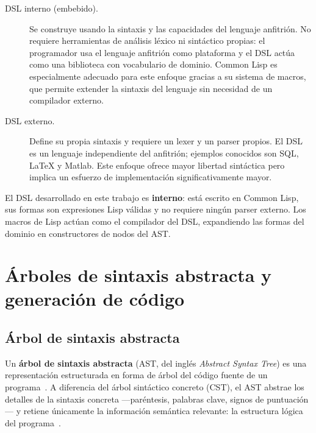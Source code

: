 \begin{description}
  \item[DSL interno (embebido).] Se construye usando la sintaxis y las
    capacidades del lenguaje anfitrión.  No requiere herramientas de análisis
    léxico ni sintáctico propias: el programador usa el lenguaje anfitrión
    como plataforma y el DSL actúa como una biblioteca con vocabulario de
    dominio.  Common Lisp es especialmente adecuado para este enfoque gracias
    a su sistema de macros, que permite extender la sintaxis del lenguaje sin
    necesidad de un compilador externo.

  \item[DSL externo.] Define su propia sintaxis y requiere un lexer y un
    parser propios.  El DSL es un lenguaje independiente del anfitrión;
    ejemplos conocidos son SQL, \LaTeX{} y Matlab.  Este enfoque ofrece
    mayor libertad sintáctica pero implica un esfuerzo de implementación
    significativamente mayor.
\end{description}

El DSL desarrollado en este trabajo es \textbf{interno}: está escrito en
Common Lisp, sus formas son expresiones Lisp válidas y no requiere ningún
parser externo.  Los macros de Lisp actúan como el compilador del DSL,
expandiendo las formas del dominio en constructores de nodos del AST.

\section{\'Arboles de sintaxis abstracta y generaci\'on de c\'odigo}
\label{sec:ast}

\subsection{\'Arbol de sintaxis abstracta}
\label{ssec:ast-def}

Un \textbf{árbol de sintaxis abstracta} (AST, del inglés \textit{Abstract
Syntax Tree}) es una representación estructurada en forma de árbol del código
fuente de un programa~\cite{aho2006}.  A diferencia del árbol sintáctico
concreto (CST), el AST abstrae los detalles de la sintaxis concreta
---paréntesis, palabras clave, signos de puntuación--- y retiene únicamente
la información semántica relevante: la estructura lógica del programa~\cite{scott2015}.

